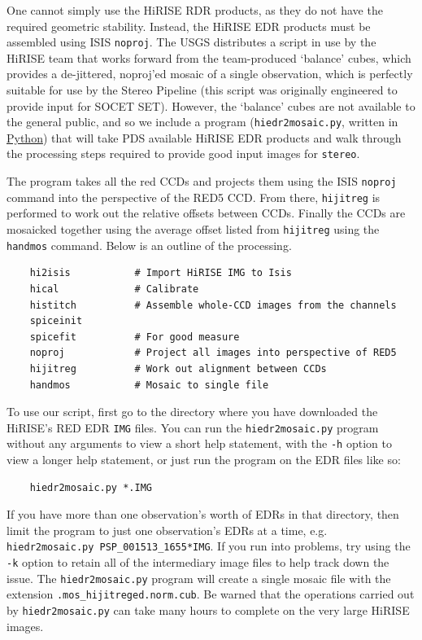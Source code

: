 One cannot simply use the \ac{HiRISE} RDR products, as they do not
have the required geometric stability.  Instead, the \ac{HiRISE}
EDR products must be assembled using \ac{ISIS} \texttt{noproj}.
The USGS distributes a script in use by the \ac{HiRISE} team that
works forward from the team-produced `balance' cubes, which provides
a de-jittered, noproj'ed mosaic of a single observation, which is
perfectly suitable for use by the Stereo Pipeline (this script was
originally engineered to provide input for SOCET SET).  However,
the `balance' cubes are not available to the general public, and
so we include a program (\texttt{hiedr2mosaic.py}, written in
\href{http://www.python.org}{Python}) that will take \ac{PDS}
available \ac{HiRISE} EDR products and walk through the processing
steps required to provide good input images for \texttt{stereo}.

The program takes all the red CCDs and projects them using the \ac{ISIS}
{\tt noproj} command into the perspective of the RED5 CCD. From there,
{\tt hijitreg} is performed to work out the relative offsets between
CCDs. Finally the CCDs are mosaicked together using the average
offset listed from {\tt hijitreg} using the {\tt handmos} command.
Below is an outline of the processing.

\begin{verbatim}
    hi2isis           # Import HiRISE IMG to Isis
    hical             # Calibrate
    histitch          # Assemble whole-CCD images from the channels
    spiceinit
    spicefit          # For good measure
    noproj            # Project all images into perspective of RED5
    hijitreg          # Work out alignment between CCDs
    handmos           # Mosaic to single file
\end{verbatim}

To use our script, first go to the directory where you have downloaded
the HiRISE's RED EDR \texttt{IMG} files. You can run the 
\texttt{hiedr2mosaic.py} program without any arguments to view a short
help statement, with the \texttt{-h} option to view a longer help statement,
or just run the program on the EDR files like so:

\begin{verbatim}
    hiedr2mosaic.py *.IMG
\end{verbatim}

If you have more than one observation's worth of EDRs in that
directory, then limit the program to just one observation's EDRs
at a time, e.g. \texttt{hiedr2mosaic.py PSP\_001513\_1655*IMG}.  If you
run into problems, try using the \texttt{-k} option to retain all of 
the intermediary image files to help track down the issue.  The
\texttt{hiedr2mosaic.py} program will create a single mosaic file 
with the extension \texttt{.mos\_hijitreged.norm.cub}.  Be warned that
the operations carried out by \texttt{hiedr2mosaic.py} can take many 
hours to complete on the very large HiRISE images.

